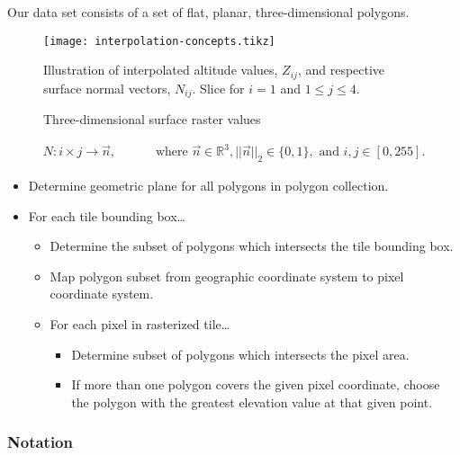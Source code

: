 Our data set consists of a set of flat, planar, three-dimensional polygons.

\begin{figure}
  \centering
  \texttt{[image: interpolation-concepts.tikz]}
  \caption{Three-dimensional surface raster values}{%
    Illustration of interpolated altitude values, $Z_{ij}$, and respective surface normal vectors, $N_{ij}$.
    Slice for $i = 1$ and $1 \leq j \leq 4$.
  }
\end{figure}

\begin{align*}
  N: i \times j \rightarrow \vec{n},
  \hspace{2em} & \text{ where } \vec{n} \in \mathbb{R}^3, ||\vec{n}||_2 \in \{0, 1\},
  \text{ and } i, j \in [0, 255].
\end{align*}


\begin{leftbar}
  \begin{itemize}[nosep,leftmargin=*]
    \item Determine geometric plane for all polygons in polygon collection.
    \item For each tile bounding box\ldots
    \begin{itemize}[nosep,leftmargin=0.5cm]
      \item Determine the subset of polygons which intersects the tile bounding box.
      \item Map polygon subset from geographic coordinate system to pixel coordinate system.
      \item For each pixel in rasterized tile\ldots
      \begin{itemize}[nosep,leftmargin=0.5cm]
        \item Determine subset of polygons which intersects the pixel area.
        \item If more than one polygon covers the given pixel coordinate, choose the polygon with the greatest elevation value at that given point.
      \end{itemize}
    \end{itemize}
  \end{itemize}
\end{leftbar}

\subsubsection{Notation}

